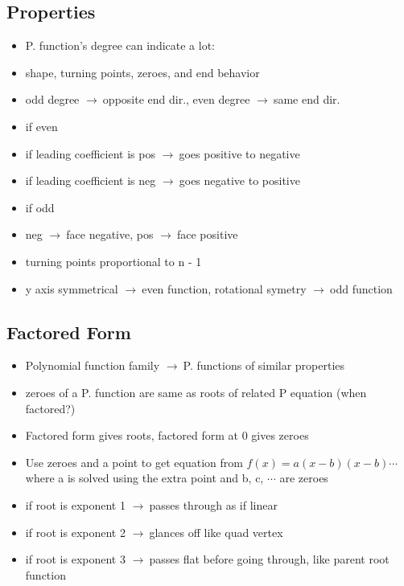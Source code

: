 \documentclass{article}
\newcommand{\rt}{$\to\ $}
\begin{document}
    \subsection{Properties}
    \begin{itemize}
        \item P. function's degree can indicate a lot:
        \item shape, turning points, zeroes, and end behavior
        \item odd degree \rt opposite end dir., even degree \rt same end dir.
        \item if even
        \item if leading coefficient is pos \rt goes positive to negative
        \item if leading coefficient is neg \rt goes negative to positive
        \item if odd
        \item neg \rt face negative, pos \rt face positive
        \item turning points proportional to n - 1
        \item y axis symmetrical \rt even function, rotational symetry \rt odd function
    \end{itemize}

    \subsection{Factored Form}
    \begin{itemize}
        \item Polynomial function family \rt P. functions of similar properties
        \item zeroes of a P. function are same as roots of related P equation (when factored?)
        \item Factored form gives roots, factored form at 0 gives zeroes
        \item Use zeroes and a point to get equation from $f(x) = a(x - b)(x - b) \cdots$ where a is solved using the extra point and b, c, $\cdots$ are zeroes
        \item if root is exponent 1 \rt passes through as if linear
        \item if root is exponent 2 \rt glances off like quad vertex
        \item if root is exponent 3 \rt passes flat before going through, like parent root function
    \end{itemize}
\end{document}
